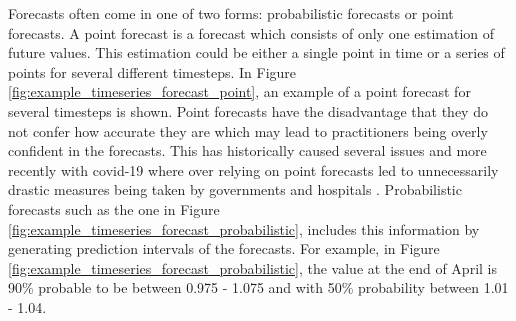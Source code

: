 Forecasts often come in one of two forms: probabilistic forecasts or point forecasts. A point forecast is a forecast which consists of only one estimation of future values. This estimation could be either a single point in time or a series of points for several different timesteps. In Figure \ref{fig:example_timeseries_forecast_point}, an example of a point forecast for several timesteps is shown. Point forecasts have the disadvantage that they do not confer how accurate they are which may lead to practitioners being overly confident in the forecasts. This has historically caused several issues and more recently with covid-19 where over relying on point forecasts led to unnecessarily drastic measures being taken by governments and hospitals \cite{IOANNIDIS2020}. Probabilistic forecasts such as the one in Figure \ref{fig:example_timeseries_forecast_probabilistic}, includes this information by generating prediction intervals of the forecasts. For example, in Figure \ref{fig:example_timeseries_forecast_probabilistic}, the value at the end of April is 90\% probable to be between 0.975 - 1.075 and with 50\% probability between 1.01 - 1.04.

